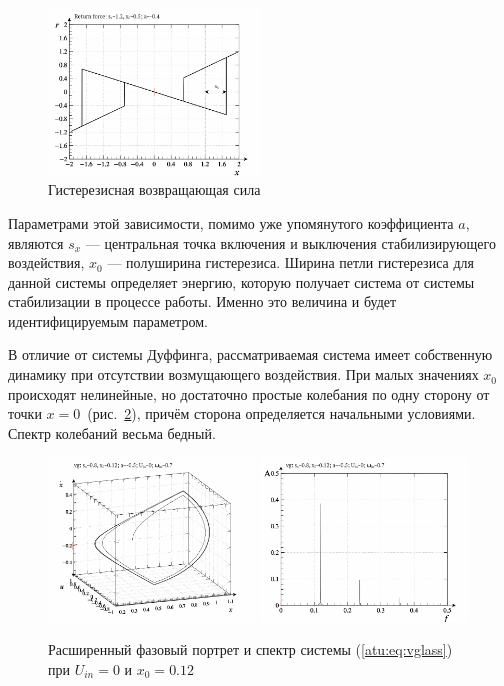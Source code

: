 \begin{figure}[htb!]
\centerline{\includegraphics[width=0.5\textwidth]{p/cha/vg/vg_rf-p_rf.png} }
\caption{Гистерезисная возвращающая сила}
\label{atu:f:vg_rf}
\end{figure}

Параметрами этой зависимости, помимо уже упомянутого коэффициента $a$,
являются $s_x$ --- центральная точка включения и выключения
стабилизирующего воздействия,
$x_0$ --- полуширина гистерезиса.
Ширина петли гистерезиса для данной системы определяет
энергию, которую получает система от системы стабилизации в процессе работы.
Именно это величина и будет идентифицируемым параметром.


В отличие от системы Дуффинга, рассматриваемая система имеет собственную
динамику при отсутствии возмущающего воздействия.
При малых значениях $x_0$ происходят нелинейные,
но достаточно простые колебания по одну сторону от
точки $x=0$~(рис.~\ref{atu:f:vglass_phase_f_u00}),
причём сторона определяется начальными условиями.
Спектр колебаний весьма бедный.

\begin{figure}[ht!]
\begin{center}
  \includegraphics[width=0.49\textwidth]{p/cha/vg/vg_0-p_phe_0x00_0x70_0x12.png}
  \hfill
  \includegraphics[width=0.49\textwidth]{p/cha/vg/vg_fft-p_f_0x00_0x70_0x12.png}
\end{center}
  \caption{Расширенный фазовый портрет и спектр системы (\ref{atu:eq:vglass}) при $U_{in}=0$ и $x_0=0.12$}
\label{atu:f:vglass_phase_f_u00}
\end{figure}

